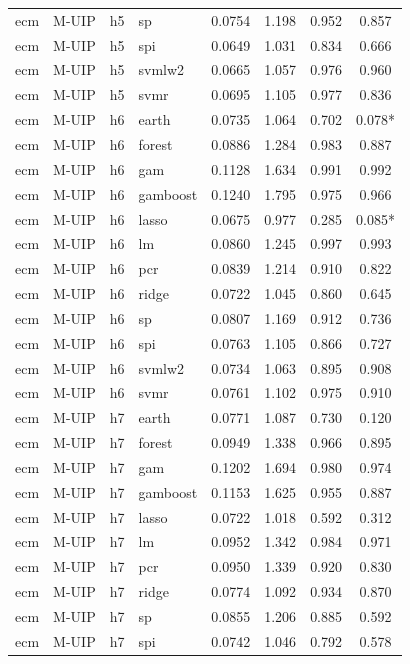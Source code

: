 \begin{ThreePartTable}
\begin{longtable}[t]{llclcccc}
ecm & M-UIP & h5 & sp & 0.0754 & 1.198 & 0.952 & 0.857\\
ecm & M-UIP & h5 & spi & 0.0649 & 1.031 & 0.834 & 0.666\\
ecm & M-UIP & h5 & svmlw2 & 0.0665 & 1.057 & 0.976 & 0.960\\
ecm & M-UIP & h5 & svmr & 0.0695 & 1.105 & 0.977 & 0.836\\
\addlinespace
ecm & M-UIP & h6 & earth & 0.0735 & 1.064 & 0.702 & 0.078*\\
ecm & M-UIP & h6 & forest & 0.0886 & 1.284 & 0.983 & 0.887\\
ecm & M-UIP & h6 & gam & 0.1128 & 1.634 & 0.991 & 0.992\\
ecm & M-UIP & h6 & gamboost & 0.1240 & 1.795 & 0.975 & 0.966\\
ecm & M-UIP & h6 & lasso & 0.0675 & 0.977 & 0.285 & 0.085*\\
ecm & M-UIP & h6 & lm & 0.0860 & 1.245 & 0.997 & 0.993\\
ecm & M-UIP & h6 & pcr & 0.0839 & 1.214 & 0.910 & 0.822\\
ecm & M-UIP & h6 & ridge & 0.0722 & 1.045 & 0.860 & 0.645\\
ecm & M-UIP & h6 & sp & 0.0807 & 1.169 & 0.912 & 0.736\\
ecm & M-UIP & h6 & spi & 0.0763 & 1.105 & 0.866 & 0.727\\
ecm & M-UIP & h6 & svmlw2 & 0.0734 & 1.063 & 0.895 & 0.908\\
ecm & M-UIP & h6 & svmr & 0.0761 & 1.102 & 0.975 & 0.910\\
\addlinespace
ecm & M-UIP & h7 & earth & 0.0771 & 1.087 & 0.730 & 0.120\\
ecm & M-UIP & h7 & forest & 0.0949 & 1.338 & 0.966 & 0.895\\
ecm & M-UIP & h7 & gam & 0.1202 & 1.694 & 0.980 & 0.974\\
ecm & M-UIP & h7 & gamboost & 0.1153 & 1.625 & 0.955 & 0.887\\
ecm & M-UIP & h7 & lasso & 0.0722 & 1.018 & 0.592 & 0.312\\
ecm & M-UIP & h7 & lm & 0.0952 & 1.342 & 0.984 & 0.971\\
ecm & M-UIP & h7 & pcr & 0.0950 & 1.339 & 0.920 & 0.830\\
ecm & M-UIP & h7 & ridge & 0.0774 & 1.092 & 0.934 & 0.870\\
ecm & M-UIP & h7 & sp & 0.0855 & 1.206 & 0.885 & 0.592\\
ecm & M-UIP & h7 & spi & 0.0742 & 1.046 & 0.792 & 0.578\\

\end{longtable}
\end{ThreePartTable}
